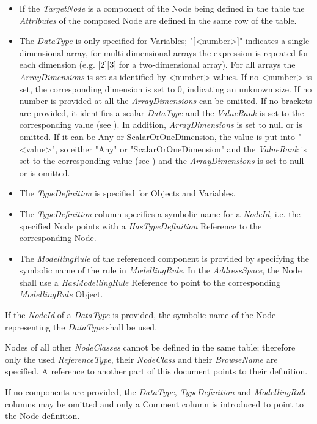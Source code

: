 \begin{itemize}
    \item If the \textit{TargetNode} is a component of the Node being defined in the table the \textit{Attributes} of the composed Node are defined in the same row of the table. 
    \item The \textit{DataType} is only specified for Variables; "[<number>]" indicates a single-dimensional array, for multi-dimensional arrays the expression is repeated for each dimension (e.g. [2][3] for a two-dimensional array). For all arrays the \textit{ArrayDimensions} is set as identified by <number> values. If no <number> is set, the corresponding dimension is set to 0, indicating an unknown size. If no number is provided at all the \textit{ArrayDimensions} can be omitted. If no brackets are provided, it identifies a scalar \textit{DataType} and the \textit{ValueRank} is set to the corresponding value (see \cite{UAPart3}). In addition, \textit{ArrayDimensions} is set to null or is omitted. If it can be Any or ScalarOrOneDimension, the value is put into "{<value>}", so either "{Any}" or "{ScalarOrOneDimension}" and the \textit{ValueRank} is set to the corresponding value (see \cite{UAPart3}) and the \textit{ArrayDimensions} is set to null or is omitted.
    \item The \textit{TypeDefinition} is specified for Objects and Variables.
    \item The \textit{TypeDefinition} column specifies a symbolic name for a \textit{NodeId}, i.e. the specified Node points with a \textit{HasTypeDefinition} Reference to the corresponding Node.
    \item The \textit{ModellingRule} of the referenced component is provided by specifying the symbolic name of the rule in \textit{ModellingRule}. In the \textit{AddressSpace}, the Node shall use a \textit{HasModellingRule} Reference to point to the corresponding \textit{ModellingRule} Object.
\end{itemize}

If the \textit{NodeId} of a \textit{DataType} is provided, the symbolic name of the Node representing the \textit{DataType} shall be used.

Nodes of all other \textit{NodeClasses} cannot be defined in the same table; therefore only the used \textit{ReferenceType}, their \textit{NodeClass} and their \textit{BrowseName} are specified. A reference to another part of this document points to their definition.

If no components are provided, the \textit{DataType}, \textit{TypeDefinition} and \textit{ModellingRule} columns may be omitted and only a Comment column is introduced to point to the Node definition.

